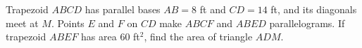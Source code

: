 Trapezoid $ABCD$ has parallel bases $AB=8$ ft and $CD=14$ ft, and its diagonals meet at $M$. Points $E$ and $F$ on $CD$ make $ABCF$ and $ABED$ parallelograms. If trapezoid $ABEF$ has area $60$ ft$^2$, find the area of triangle $ADM$.
